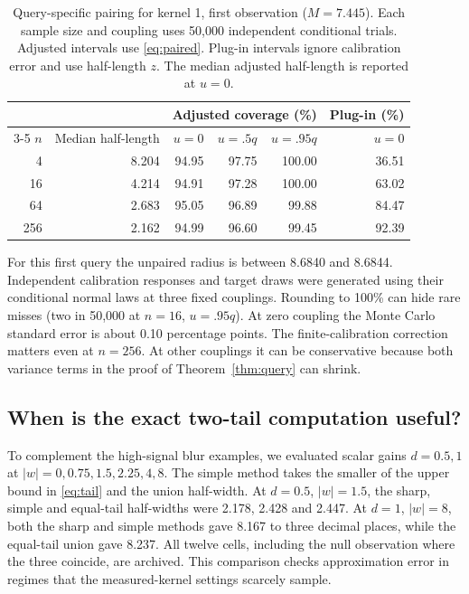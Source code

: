 \begin{table}[ht]
\centering
\caption{Query-specific pairing for kernel 1, first observation ($M=7.445$). Each sample size and coupling uses 50,000 independent conditional trials. Adjusted intervals use \eqref{eq:paired}. Plug-in intervals ignore calibration error and use half-length $z$. The median adjusted half-length is reported at $u=0$.}
\begin{tabular}{rrrrrr}
\toprule
& & \multicolumn{3}{c}{Adjusted coverage (\%)} & Plug-in (\%)\\
\cmidrule(lr){3-5}
$n$ & Median half-length & $u=0$ & $u=.5q$ & $u=.95q$ & $u=0$\\
\midrule
4   & 8.204 &94.95&97.75&100.00&36.51\\
16  & 4.214 &94.91&97.28&100.00&63.02\\
64  & 2.683 &95.05&96.89&99.88&84.47\\
256 & 2.162 &94.99&96.60&99.45&92.39\\
\bottomrule
\end{tabular}\label{tab:paired}
\end{table}
For this first query the unpaired radius is between 8.6840 and 8.6844. Independent calibration responses and target draws were generated using their conditional normal laws at three fixed couplings. Rounding to 100\% can hide rare misses (two in 50,000 at $n=16$, $u=.95q$). At zero coupling the Monte Carlo standard error is about 0.10 percentage points. The finite-calibration correction matters even at $n=256$. At other couplings it can be conservative because both variance terms in the proof of Theorem~\ref{thm:query} can shrink.

\subsection{When is the exact two-tail computation useful?}
To complement the high-signal blur examples, we evaluated scalar gains $d=0.5,1$ at $|w|=0,0.75,1.5,2.25,4,8$. The simple method takes the smaller of the upper bound in \eqref{eq:tail} and the union half-width. At $d=0.5$, $|w|=1.5$, the sharp, simple and equal-tail half-widths were 2.178, 2.428 and 2.447. At $d=1$, $|w|=8$, both the sharp and simple methods gave 8.167 to three decimal places, while the equal-tail union gave 8.237. All twelve cells, including the null observation where the three coincide, are archived. This comparison checks approximation error in regimes that the measured-kernel settings scarcely sample.
